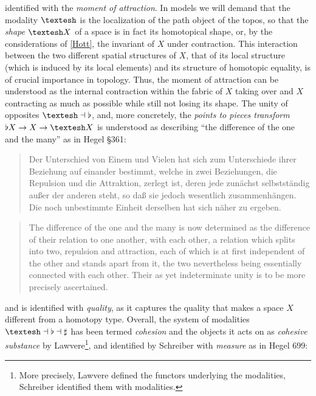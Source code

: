\documentclass{article}
\begin{document}
identified with the \emph{moment of attraction}. In models we will demand that the modality $\textrm{\textesh}$ is the localization of the path object of the topos, so that the \emph{shape} $\textrm{\textesh} X$ of a space is in fact its homotopical shape, or, by the considerations of \ref{Hott}, the invariant of $X$ under contraction. This interaction between the two different spatial structures of $X$, that of its local structure (which is induced by its local elements) and its structure of homotopic equality, is of crucial importance in topology. Thus, the moment of attraction can be understood as the internal contraction within the fabric of $X$ taking over and $X$ contracting as much as possible while still not losing its shape. The unity of opposites $\textrm{\textesh}\dashv\flat$, and, more concretely, the \emph{points to pieces transform} $\flat X\rightarrow X\rightarrow \textrm{\textesh} X$ is understood as describing ``the difference of the one and the many'' as in Hegel §361:

\begin{quote}
    Der Unterschied von Einem und Vielen hat sich zum Unterschiede ihrer Beziehung auf einander bestimmt, welche in zwei Beziehungen, die Repulsion und die Attraktion, zerlegt ist, deren jede zunächst selbstständig außer der anderen steht, so daß sie jedoch wesentlich zusammenhängen. Die noch unbestimmte Einheit derselben hat sich näher zu ergeben.
\end{quote}
    
\begin{quote}
    The difference of the one and the many is now determined as the difference of their relation to one another, with each other, a relation which splits into two, repulsion and attraction, each of which is at first independent of the other and stands apart from it, the two nevertheless being essentially connected with each other. Their as yet indeterminate unity is to be more precisely ascertained.
\end{quote}

and is identified with \emph{quality}, as it captures the quality that makes a space $X$ different from a homotopy type. Overall, the system of modalities $\textrm{\textesh}\dashv\flat\dashv\sharp$ has been termed \emph{cohesion} and the objects it acts on as \emph{cohesive substance} by Lawvere\cite{Coh}\footnote{More precisely, Lawvere defined the functors underlying the modalities, Schreiber identified them with modalities.}, and identified by Schreiber with \emph{measure} as in Hegel 699:
\end{document}
